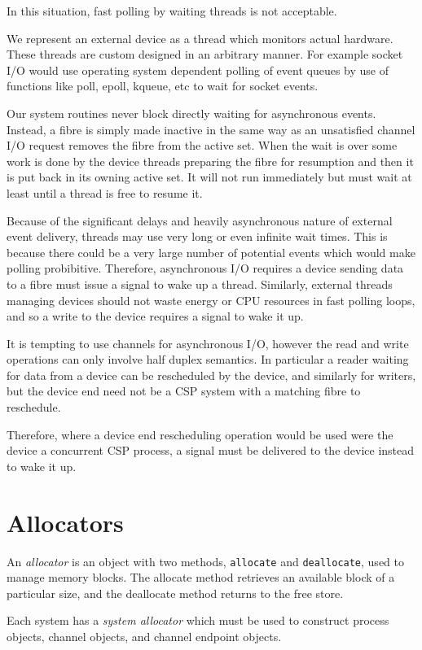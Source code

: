 \documentclass[oneside]{book}
\begin{document}
In this situation, fast polling by waiting threads is not acceptable.

We represent an external device as a thread which monitors actual hardware.
These threads are custom designed in an arbitrary manner. For example
socket I/O would use operating system dependent polling of event queues
by use of functions like poll, epoll, kqueue, etc to wait for
socket events.

Our system routines never block directly waiting for asynchronous events.
Instead, a fibre is simply made inactive in the same way as an unsatisfied
channel I/O request removes the fibre from the active set. When the 
wait is over some work is done by the device threads preparing the
fibre for resumption and then it is put back in its owning active set.
It will not run immediately but must wait at least until a thread
is free to resume it.

Because of the significant delays and heavily asynchronous nature
of external event delivery, threads may use very long or even infinite wait times.
This is because there could be a very large number of potential
events which would make polling probibitive. Therefore, asynchronous
I/O requires a device sending data to a fibre must issue a signal to
wake up a thread. Similarly, external threads managing devices
should not waste energy or CPU resources in fast polling loops,
and so a write to the device requires a signal to wake it up.

It is tempting to use channels for asynchronous I/O, however the
read and write operations can only involve half duplex semantics.
In particular a reader waiting for data from a device can be rescheduled
by the device, and similarly for writers, but the device end need not
be a CSP system with a matching fibre to reschedule.

Therefore, where a device end rescheduling operation would be used
were the device a concurrent CSP process, a signal must be delivered
to the device instead to wake it up.


\chapter{Allocators}
An {\em allocator} is an object with two methods, \verb$allocate$ and 
\verb$deallocate$, used to manage memory blocks. The allocate method
retrieves an available block of a particular size, and the deallocate
method returns to the free store.

Each system has a {\em system allocator} which must be used to construct
process objects, channel objects, and channel endpoint objects.
\end{document}
